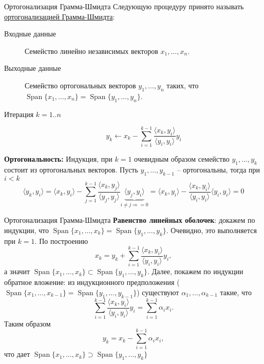\documentclass[10pt, handout]{beamer}
\DeclareMathOperator{\lin}{Span}
\begin{document}
\begin{frame}{Ортогонализация Грамма-Шмидта}
Следующую процедуру принято называть \underline{ортогонализацией Грамма-Шмидта}:
\begin{description}
\item[Входные данные] Семейство линейно независимых векторов $x_1, \ldots, x_n$.
\item[Выходные данные] Семейство ортогональных векторов $y_1, \ldots, y_n$ таких, что $\lin\{x_1, \ldots, x_n\}=\lin\{y_1, \ldots, y_n\}$.
\item[Итерация $k=1..n$]
$$
y_k\leftarrow x_k-\sum_{i=1}^{k-1}\frac{\langle x_k, y_i\rangle}{\langle y_i, y_i\rangle} y_i
$$
\end{description}
\pause
\textbf{Ортогональность:} Индукция, при $k=1$ очевидным образом семейство $y_1, \ldots, y_k$ состоит из ортогональных векторов. Пусть $y_1, \ldots, y_{k-1}$ -- ортогональны, тогда при $i<k$
$$
\langle y_k, y_i\rangle = \langle x_k, y_i\rangle-\sum_{j=1}^{k-1}\frac{\langle x_k, y_j\rangle}{\langle y_j, y_j\rangle}\underbrace{\langle y_j, y_i\rangle}_{i\neq j\Rightarrow =0}=\langle x_k, y_i\rangle - \frac{\langle x_k, y_i\rangle}{\langle y_i, y_i\rangle}\langle y_i, y_i\rangle=0
$$
\end{frame}

\begin{frame}{Ортогонализация Грамма-Шмидта}
\textbf{Равенство линейных оболочек}: докажем по индукции, что $\lin\{x_1, \ldots, x_k\}=\lin\{y_1, \ldots, y_k\}$. Очевидно, это выполняется при $k=1$. По построению
$$
x_k=y_k+\sum_{i=1}^{k-1}\frac{\langle x_k, y_i\rangle}{\langle y_i, y_i\rangle} y_i,
$$
а значит $\lin\{x_1, \ldots, x_k\}\subset \lin\{y_1, \ldots, y_k\}$. \pause Далее, покажем по индукции обратное вложение: из индукционного предположения ($\lin\{x_1, \ldots, x_{k-1}\}= \lin\{y_1, \ldots, y_{k-1}\}$) существуют $\alpha_1, \ldots, \alpha_{k-1}$ такие, что
$$
\sum_{i=1}^{k-1}\frac{\langle x_k, y_i\rangle}{\langle y_i, y_i\rangle} y_i=\sum_{i=1}^{k-1}\alpha_i x_i.
$$
\pause
Таким образом 
$$
y_k=x_k-\sum_{i=1}^{k-1}\alpha_i x_i,
$$
что дает $\lin\{x_1, \ldots, x_k\}\supset \lin\{y_1, \ldots, y_k\}$
\end{frame}
\end{document}
